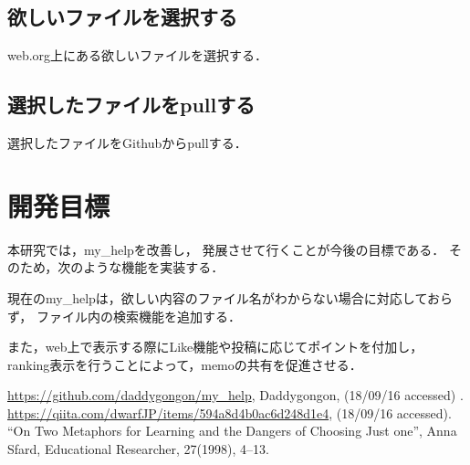 \documentclass[a4j,twocolumn,uplatex]{jsarticle}
\begin{document}
\subsection{欲しいファイルを選択する}
\label{sec-2-4}
web.org上にある欲しいファイルを選択する．

\subsection{選択したファイルをpullする}
\label{sec-2-5}
選択したファイルをGithubからpullする．


\begin{comment}
\begin{verbatim}
> my_Help list emacs -c
- emacsのキーバインド
- 
特殊キー操作
-   C-f, controlキーを押しながら    'f'
-   M-f, escキーを押した後一度離して'f'
-     操作の中断C-g, 操作の取り消し(Undo) C-x u
-----
cursor
- C-f, move Forwrard,    前or右へ
- C-b, move Backwrard,   後or左へ
．．．
\end{verbatim}


my\_helpはshell上のdirectory位置によらずどこからでも
呼び出せて，applicationを切り替えることなく参照できる．
また，編集が手軽にできることから
自分独自のメモを取ることによって，
記憶の定着を促すツールとしての活用を意図している．
\end{comment}


\section{開発目標}
本研究では，my\_helpを改善し，
発展させて行くことが今後の目標である．
そのため，次のような機能を実装する．

現在のmy\_helpは，欲しい内容のファイル名がわからない場合に対応しておらず，
ファイル内の検索機能を追加する．

また，web上で表示する際にLike機能や投稿に応じてポイントを付加し，
ranking表示を行うことによって，memoの共有を促進させる．



{\small\setlength\baselineskip{10pt}	%
\begin{thebibliography}{9}
\url{https://github.com/daddygongon/my_help}, Daddygongon, (18/09/16 accessed) .
 \url{https://qiita.com/dwarfJP/items/594a8d4b0ac6d248d1e4}, (18/09/16 accessed).
“On Two Metaphors for Learning and the Dangers of Choosing Just one”, Anna
Sfard, Educational Researcher, 27(1998), 4–13.
\end{thebibliography}
}
\end{document}

